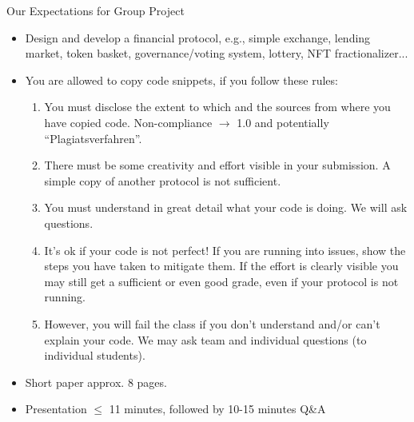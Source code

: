 \documentclass[handout]{beamer}
\begin{document}
\begin{frame}{Our Expectations for Group Project}
\label{EXPECTATIONS}
\footnotesize
	\begin{itemize}
		\item<1-> \color{focus}Design and develop a financial protocol\color{black}, e.g., simple exchange, lending market, token basket, governance/voting system, lottery, NFT fractionalizer...
		\item<2-> You are \color{focus} allowed to copy code \color{black} snippets, if you follow these rules:
		\begin{enumerate}\footnotesize
			\item<3-> \color{focus} You must disclose \color{black} the \color{focus} extent \color{black} to which and the \color{focus} sources \color{black} from where you have copied code. Non-compliance $\rightarrow$ 1.0 and potentially ``Plagiatsverfahren''. \vspace{0.35em}
			\item<4-> There must be some \color{focus} creativity and effort \color{black} visible in your submission. A simple copy of another protocol is not sufficient.\vspace{0.35em}
			\item<5-> You \color{focus}must understand \color{black} in great detail what your code is doing. We will ask questions. 
			\item<6-> \color{focus} It's ok if your code is not perfect! \color{black} If you are running into issues, show the steps you have taken to mitigate them. If the effort is clearly visible you may still get a sufficient or even good grade, even if your protocol is not running.
			\item<7-> However, you \color{focus}will fail \color{black}the class \color{focus}if you don't understand and/or can't explain your code\color{black}. We may ask team and individual questions (to individual students).
		\end{enumerate}
		\item<8-> Short paper approx. 8 pages. 
		\item<9-> Presentation $\leq$ 11 minutes, followed by 10-15 minutes Q\&A
	\end{itemize}
\end{frame}
\end{document}
